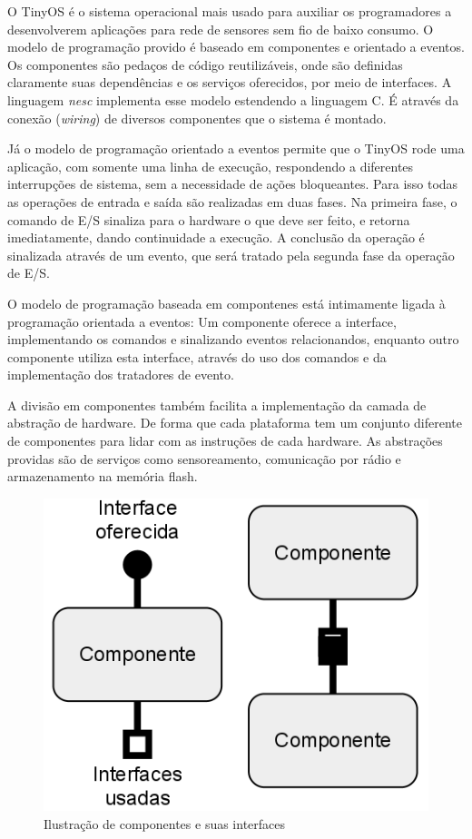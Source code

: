 O TinyOS é o sistema operacional mais usado para auxiliar os programadores a desenvolverem aplicações para rede de
sensores sem fio de baixo consumo.
O modelo de programação provido é baseado em componentes e orientado a eventos.
Os componentes são pedaços de código reutilizáveis, onde são definidas claramente suas dependências e os serviços
oferecidos, por meio de interfaces. A linguagem \textit{nesc} implementa esse modelo estendendo a linguagem C.
É através da conexão (\textit{wiring}) de diversos componentes que o sistema é montado.

Já o modelo de programação orientado a eventos permite que o TinyOS rode uma aplicação, com somente uma linha de
execução, respondendo a diferentes interrupções de sistema, sem a necessidade de ações bloqueantes. 
Para isso todas as operações de entrada e saída são realizadas em duas fases.
Na primeira fase, o comando de E/S sinaliza para o hardware o que deve ser feito, e retorna imediatamente, dando continuidade a
execução. A conclusão da operação é sinalizada através de um evento, que será tratado pela segunda fase da operação de E/S.

O modelo de programação baseada em compontenes está intimamente ligada à programação orientada a eventos: Um componente
oferece a interface, implementando os comandos e sinalizando eventos relacionandos, enquanto outro componente
utiliza esta interface, através do uso dos comandos e da implementação dos tratadores de evento.

A divisão em componentes também facilita a implementação da camada de abstração de hardware. De forma que cada
plataforma tem um conjunto diferente de componentes para lidar com as instruções de cada hardware.
As abstrações providas são de serviços como sensoreamento, comunicação por rádio e armazenamento na memória flash.

\begin{figure}[htb]
\centering
\includegraphics[scale=0.4]{images/interfaces-componentes.png}
\caption{Ilustração de componentes e suas interfaces}
\end{figure}

